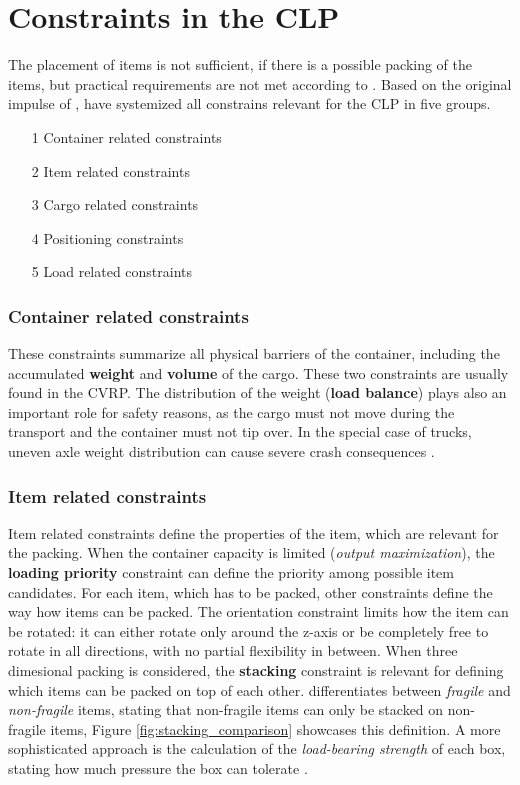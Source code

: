 \section{Constraints in the CLP}
The placement of items is not sufficient, if there is a possible packing
of the items, but practical requirements are not met according to \cite{bischoff_issues_1995}.
Based on the original impulse of \cite{bischoff_issues_1995}, \cite{bortfeldt_constraints_2013}
have systemized all constrains relevant for the \gls{CLP} in five groups.
\begin{itemize}
    \item[1] Container related constraints
    \item[2] Item related constraints
    \item[3] Cargo related constraints
    \item[4] Positioning constraints
    \item[5] Load related constraints
\end{itemize}




\subsubsection{Container related constraints}
These constraints summarize all physical barriers of the container, including
the accumulated \textbf{weight} and \textbf{volume} of the cargo. These two
constraints are usually found in the \gls{CVRP}. The distribution of the weight
(\textbf{load balance}) plays also an important role for safety reasons, as the
cargo must not move during the transport and the container must not tip over.
In the special case of trucks, uneven axle weight distribution can cause severe
crash consequences \parencite{krebs_advanced_2021}.

\subsubsection{Item related constraints}
Item related constraints define the properties of the item, which are relevant
for the packing. When the container capacity is limited (\textit{output maximization}),
the \textbf{loading priority} constraint can define the priority among possible
item candidates. For each item, which has to be packed, other constraints define
the way how items can be packed. The orientation constraint limits how the item
can be rotated: it can either rotate only around the z-axis or be completely
free to rotate in all directions, with no partial flexibility in between.
When three dimesional packing is considered, the \textbf{stacking} constraint
is relevant for defining which items can be packed on top of each other. \cite{gendreau_tabu_2006}
differentiates between \textit{fragile} and \textit{non-fragile} items, stating
that non-fragile items can only be stacked on non-fragile items, Figure \ref{fig:stacking_comparison} showcases
this definition. A more sophisticated approach is the calculation  of the
\textit{load-bearing strength} of each box, stating how much pressure the box
can tolerate \cite{krebs_advanced_2021}.


